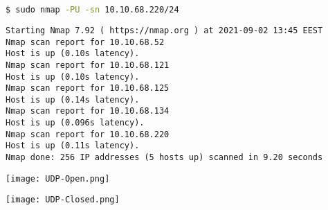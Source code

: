 \documentclass[11pt]{article}
\newenvironment{commandbox}[1][]{
    \begin{tcolorbox}[
        colback=kalibackground,
        colframe=commandcolor,
        fonttitle=\bfseries\color{white},
        title=#1,
        breakable=true
    ]
}{
    \end{tcolorbox}
}
\begin{document}
\begin{commandbox}[UDP Scan (-PU)]
\begin{lstlisting}[language=bash, style=bash, basicstyle=\small\ttfamily\color{warningcolor}]
$ sudo nmap -PU -sn 10.10.68.220/24
\end{lstlisting}

\begin{lstlisting}[basicstyle=\small\ttfamily\color{kalitext}]
Starting Nmap 7.92 ( https://nmap.org ) at 2021-09-02 13:45 EEST
Nmap scan report for 10.10.68.52
Host is up (0.10s latency).
Nmap scan report for 10.10.68.121
Host is up (0.10s latency).
Nmap scan report for 10.10.68.125
Host is up (0.14s latency).
Nmap scan report for 10.10.68.134
Host is up (0.096s latency).
Nmap scan report for 10.10.68.220
Host is up (0.11s latency).
Nmap done: 256 IP addresses (5 hosts up) scanned in 9.20 seconds
\end{lstlisting}
\end{commandbox}
\begin{center}
    \texttt{[image: UDP-Open.png]}
    \end{center}
    \begin{center}
        \texttt{[image: UDP-Closed.png]}
        \end{center}
\end{document}
